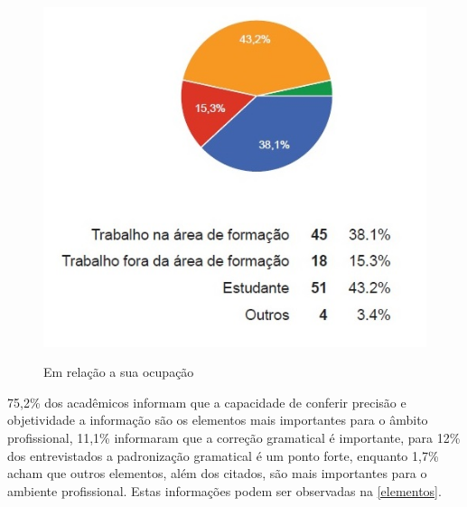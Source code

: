 \documentclass[
	article,			%
	11pt,				%
	oneside,			%
	a4paper,			%
	english,			%
	brazil,				%
	sumario=tradicional
	]{abntex2}
\begin{document}
\begin{figure}[h]  
	\begin{center} 
		\begin{center}
			\changecaptionwidth 
			\captionwidth{13.5cm} %
			\caption{\label{ocupacao} Em relação a sua ocupação}
			{\includegraphics[scale=0.8]{imagens/ocupacao}}
		\end{center}
	\end{center}
\end{figure}
\FloatBarrier


75,2\% dos acadêmicos informam que a capacidade de conferir precisão e objetividade a informação são os elementos mais importantes para o âmbito profissional, 11,1\% informaram que a correção gramatical é importante, para 12\% dos entrevistados a padronização gramatical é um ponto forte, enquanto 1,7\% acham que outros elementos, além dos citados, são mais importantes para o ambiente profissional. Estas informações podem ser observadas na \figurename{ \ref{elementos}}.
\end{document}
